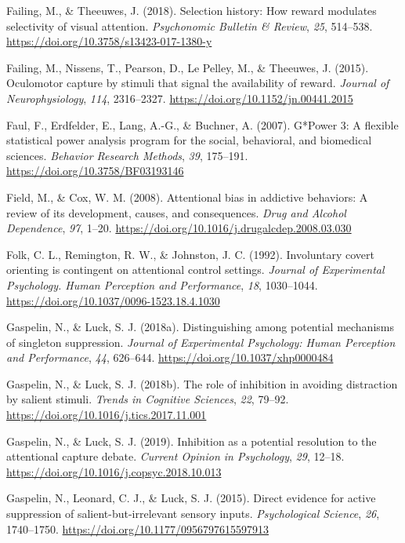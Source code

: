 \documentclass[man, a4paper, noextraspace, 11pt,floatsintext]{apa6}
\theoremstyle{definition}
\theoremstyle{definition}
\theoremstyle{definition}
\theoremstyle{remark}
\begin{document}
\hypertarget{ref-Failing2018}{}
Failing, M., \& Theeuwes, J. (2018). Selection history: How reward
modulates selectivity of visual attention. \emph{Psychonomic Bulletin \&
Review}, \emph{25}, 514--538.
\url{https://doi.org/10.3758/s13423-017-1380-y}

\hypertarget{ref-Failing2015}{}
Failing, M., Nissens, T., Pearson, D., Le Pelley, M., \& Theeuwes, J.
(2015). Oculomotor capture by stimuli that signal the availability of
reward. \emph{Journal of Neurophysiology}, \emph{114}, 2316--2327.
\url{https://doi.org/10.1152/jn.00441.2015}

\hypertarget{ref-Faul2007}{}
Faul, F., Erdfelder, E., Lang, A.-G., \& Buchner, A. (2007). G*Power 3:
A flexible statistical power analysis program for the social,
behavioral, and biomedical sciences. \emph{Behavior Research Methods},
\emph{39}, 175--191. \url{https://doi.org/10.3758/BF03193146}

\hypertarget{ref-Field2008}{}
Field, M., \& Cox, W. M. (2008). Attentional bias in addictive
behaviors: A review of its development, causes, and consequences.
\emph{Drug and Alcohol Dependence}, \emph{97}, 1--20.
\url{https://doi.org/10.1016/j.drugalcdep.2008.03.030}

\hypertarget{ref-Folk1992}{}
Folk, C. L., Remington, R. W., \& Johnston, J. C. (1992). Involuntary
covert orienting is contingent on attentional control settings.
\emph{Journal of Experimental Psychology. Human Perception and
Performance}, \emph{18}, 1030--1044.
\url{https://doi.org/10.1037/0096-1523.18.4.1030}

\hypertarget{ref-Gaspelin2018b}{}
Gaspelin, N., \& Luck, S. J. (2018a). Distinguishing among potential
mechanisms of singleton suppression. \emph{Journal of Experimental
Psychology: Human Perception and Performance}, \emph{44}, 626--644.
\url{https://doi.org/10.1037/xhp0000484}

\hypertarget{ref-Gaspelin2018}{}
Gaspelin, N., \& Luck, S. J. (2018b). The role of inhibition in avoiding
distraction by salient stimuli. \emph{Trends in Cognitive Sciences},
\emph{22}, 79--92. \url{https://doi.org/10.1016/j.tics.2017.11.001}

\hypertarget{ref-Gaspelin2018a}{}
Gaspelin, N., \& Luck, S. J. (2019). Inhibition as a potential
resolution to the attentional capture debate. \emph{Current Opinion in
Psychology}, \emph{29}, 12--18.
\url{https://doi.org/10.1016/j.copsyc.2018.10.013}

\hypertarget{ref-Gaspelin2015}{}
Gaspelin, N., Leonard, C. J., \& Luck, S. J. (2015). Direct evidence for
active suppression of salient-but-irrelevant sensory inputs.
\emph{Psychological Science}, \emph{26}, 1740--1750.
\url{https://doi.org/10.1177/0956797615597913}
\end{document}
